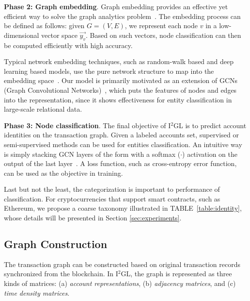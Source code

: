 \textbf{Phase 2: Graph embedding}.
Graph embedding provides an effective yet efficient way to solve the graph analytics problem~\cite{cai2018comprehensive}. The embedding process can be defined as follows: given $G=(V,E)$, we represent each node $v$ in a low-dimensional vector space $\vec{y_v}$. Based on such vectors, node classification can then be computed efficiently with high accuracy.

Typical network embedding techniques, such as random-walk based and deep learning based models, use the pure network structure to map into the embedding space~\cite{goyal2018capturing}. Our model is primarily motivated as an extension of GCNs (Graph Convolutional Networks)~\cite{kipf2016semi,schlichtkrull2018modeling}, which puts the features of nodes and edges into the representation, since it shows effectiveness for entity classification in large-scale relational data.


\textbf{Phase 3: Node classification}.
The final objective of I$^2$GL is to predict account identities on the transaction graph. Given a labeled accounts set, supervised or semi-supervised methods can be used for entities classification. An intuitive way is simply stacking GCN layers of the form with a softmax ($\cdot$) activation on the output of the last layer~\cite{schlichtkrull2018modeling}. A loss function, such as cross-entropy error function, can be used as the objective in training.

Last but not the least, the categorization is important to performance of classification. For cryptocurrencies that support smart contracts, such as Ethereum, we propose a coarse taxonomy illustrated in TABLE~\ref{table:identity}, whose details will be presented in Section \ref{sec:experiments}.


\subsection{Graph Construction}
The transaction graph can be constructed based on original transaction records synchronized from the blockchain. In I$^2$GL, the graph is represented as three kinds of matrices: (a) \emph{account representations}, (b) \emph{adjacency matrices}, and (c) \emph{time density matrices}.


